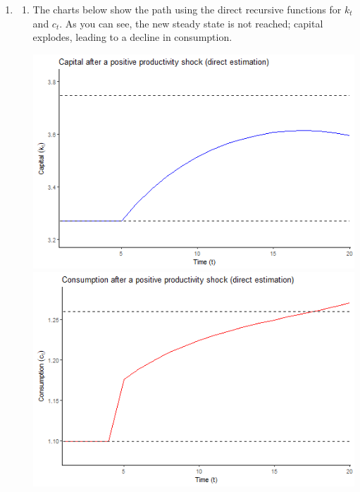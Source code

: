 \documentclass{article}
\begin{document}
\begin{enumerate}
\begin{enumerate}
			\item 
				\begin{enumerate}
					\item The charts below show the path using the direct recursive functions for $k_t$ and $c_t$. As you can see, the new steady state is not reached; capital explodes, leading to a decline in consumption.
						\begin{center}
							\includegraphics[scale=.6]{problem1.6_timeplot_k.png}
							\includegraphics[scale=.6]{problem1.6_timeplot_c.png}
						\end{center}
						

\end{enumerate}
\end{enumerate}
\end{enumerate}
\end{document}
